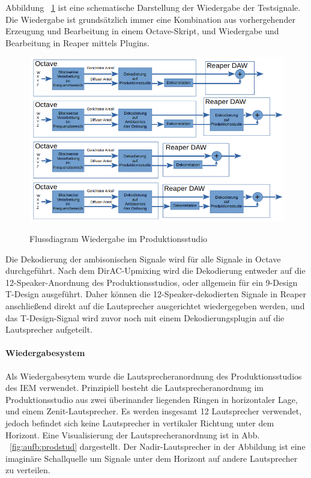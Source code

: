 Abbildung ~\ref{fig:algos} ist eine schematische Darstellung der Wiedergabe der Testsignale. Die Wiedergabe ist grundsätzlich immer eine Kombination aus vorhergehender Erzeugung und Bearbeitung in einem Octave-Skript, und Wiedergabe und Bearbeitung in Reaper mittels Plugins.

\begin{figure}[!ht]
  \centering
  \includegraphics[width=1\textwidth]{aufbau/plots/algos.png}
  \label{fig:algos}
  \caption{Flussdiagram Wiedergabe im Produktionsstudio}
\end{figure}

Die Dekodierung der ambisonischen Signale wird für alle Signale in Octave durchgeführt. Nach dem DirAC-Upmixing wird die Dekodierung entweder auf die 12-Speaker-Anordnung des Produktionsstudios, oder allgemein für ein 9-Design T-Design ausgeführt. Daher können die 12-Speaker-dekodierten Signale in Reaper anschließend direkt auf die Lautsprecher ausgerichtet wiedergegeben werden, und das T-Design-Signal wird zuvor noch mit einem Dekodierungsplugin auf die Lautsprecher aufgeteilt.

\paragraph{Wiedergabesystem}
Als Wiedergabesytem wurde die Lautsprecheranordnung des Produktionsstudios des IEM verwendet. Prinzipiell besteht die Lautsprecheranordnung im Produktionsstudio aus zwei überinander liegenden Ringen in horizontaler Lage, und einem Zenit-Lautsprecher. Es werden insgesamt 12 Lautsprecher verwendet, jedoch befindet sich keine Lautsprecher in vertikaler Richtung unter dem Horizont. Eine Visualisierung der Lautsprecheranordnung ist in Abb. ~\ref{fig:aufb:prodstud} dargestellt. Der Nadir-Lautsprecher in der Abbildung ist eine imaginäre Schallquelle um Signale unter dem Horizont auf andere Lautsprecher zu verteilen.

